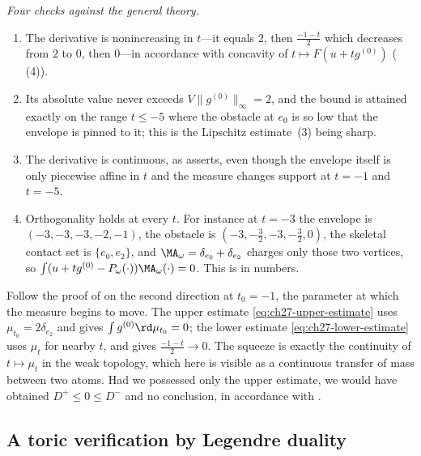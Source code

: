 \begin{example}
\emph{Four checks against the general theory.}
\begin{enumerate}
\item The derivative is nonincreasing in $t$---it equals $2$, then
$\tfrac{-1-t}2$ which decreases from $2$ to $0$, then $0$---in
accordance with concavity of $t\mapsto F(u+tg^{(0)})$
(\,(4)).
\item Its absolute value never exceeds
$V\lVert g^{(0)}\rVert_\infty=2$, and the bound is attained exactly on the
range $t\leq-5$ where the obstacle at $e_0$ is so low that the envelope
is pinned to it; this is the Lipschitz estimate
\,(3) being sharp.
\item The derivative is continuous, as
 asserts, even though the
envelope itself is only piecewise affine in $t$ and the measure changes
support at $t=-1$ and $t=-5$.
\item Orthogonality holds at every $t$.  For instance at $t=-3$ the
envelope is $(-3,-3,-3,-2,-1)$, the obstacle is
$(-3,-\tfrac32,-3,-\tfrac32,0)$, the skeletal contact set is $\{e_0,e_2\}$, and
$\MA_\omega=\delta_{e_0}+\delta_{e_2}$ charges only those two vertices,
so $\int(u+tg^{(0)}-P_\omega(\cdot))\MA_\omega(\cdot)=0$.  This is
 in numbers.
\end{enumerate}
\end{example}

\begin{remark}
\label{rem:ch27-curve-example-lesson}
Follow the proof of
 on the second direction at
$t_0=-1$, the parameter at which the measure begins to move.  The upper
estimate \eqref{eq:ch27-upper-estimate} uses $\mu_{t_0}=2\delta_{e_2}$ and
gives $\int g^{(0)}\rd\mu_{t_0}=0$; the lower estimate
\eqref{eq:ch27-lower-estimate} uses $\mu_t$ for nearby $t$, and gives
$\tfrac{-1-t}2\to0$.  The squeeze is exactly the continuity of
$t\mapsto\mu_t$ in the weak topology, which here is visible as a
continuous transfer of mass between two atoms.  Had we possessed only the
upper estimate, we would have obtained $D^+\leq0\leq D^-$ and no
conclusion, in accordance with
.
\end{remark}

\subsection{A toric verification by Legendre duality}
\label{sec:ch27-toric-numbers}

